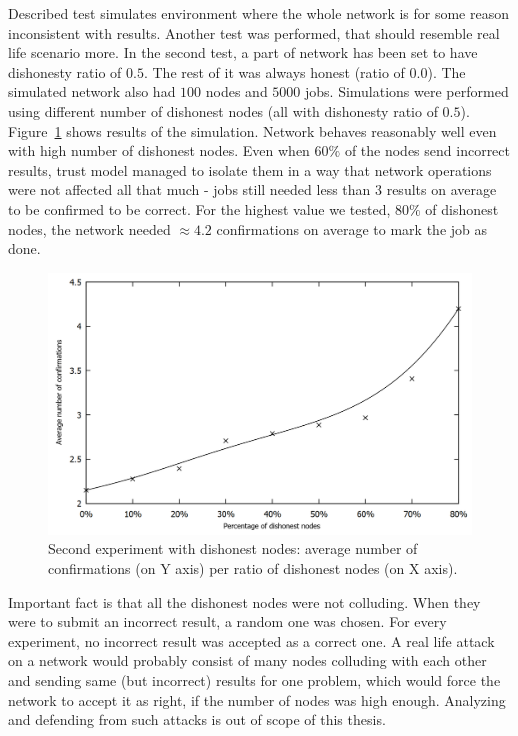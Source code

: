 Described test simulates environment where the whole network is for some reason inconsistent with results. Another test was performed, that should resemble real life scenario more. In the second test, a part of network has been set to have dishonesty ratio of $0.5$. The rest of it was always honest (ratio of $0.0$). The simulated network also had $100$ nodes and $5000$ jobs. Simulations were performed using different number of dishonest nodes (all with dishonesty ratio of $0.5$). Figure~\ref{f:confirmations2} shows results of the simulation. Network behaves reasonably well even with high number of dishonest nodes. Even when $60\%$ of the nodes send incorrect results, trust model managed to isolate them in a way that network operations were not affected all that much - jobs still needed less than 3 results on average to be confirmed to be correct. For the highest value we tested, $80\%$ of dishonest nodes, the network needed $\approx 4.2$ confirmations on average to mark the job as done.

\begin{figure}
\centering
\includegraphics[width=\textwidth]{diagrams/confirmations2.png}
\caption{Second experiment with dishonest nodes: average number of confirmations (on Y axis) per ratio of dishonest nodes (on X axis).}
\label{f:confirmations2}
\end{figure}

Important fact is that all the dishonest nodes were not colluding. When they were to submit an incorrect result, a random one was chosen. For every experiment, no incorrect result was accepted as a correct one. A real life attack on a network would probably consist of many nodes colluding with each other and sending same (but incorrect) results for one problem, which would force the network to accept it as right, if the number of nodes was high enough. Analyzing and defending from such attacks is out of scope of this thesis.

